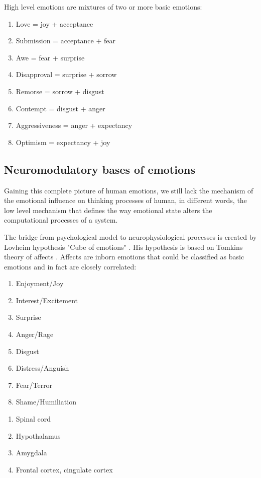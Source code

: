 High level emotions are mixtures of two or more basic emotions:

\begin{enumerate}
 \item  Love = joy + acceptance
 \item  Submission = acceptance + fear
 \item  Awe = fear + surprise
 \item  Disapproval = surprise + sorrow
 \item  Remorse = sorrow + disgust
 \item  Contempt = disgust + anger
 \item  Aggressiveness = anger + expectancy
 \item  Optimism = expectancy + joy
\end{enumerate}

\subsection{Neuromodulatory bases of emotions}

Gaining this complete picture of human emotions, we still lack the mechanism of the emotional influence on thinking processes of human, in different words, the low level mechanism that defines the way emotional state alters the computational processes of a system.

The bridge from psychological model to neurophysiological processes is created by Lovheim hypothesis "Cube of emotions" \cite{cubeofemotions}. His hypothesis is based on Tomkins theory of affects \cite{tomkins1, tomkins2, tomkins3, quest, primer_affect_psychology}. Affects are inborn emotions that could be classified as basic emotions and in fact are closely correlated:

\begin{enumerate}
 \item  Enjoyment/Joy
 \item  Interest/Excitement
 \item  Surprise
 \item  Anger/Rage
 \item  Disgust
 \item  Distress/Anguish
 \item  Fear/Terror
 \item  Shame/Humiliation
\end{enumerate}



\begin{enumerate}
 \item  Spinal cord
 \item  Hypothalamus
 \item  Amygdala
 \item  Frontal cortex, cingulate cortex
\end{enumerate}

